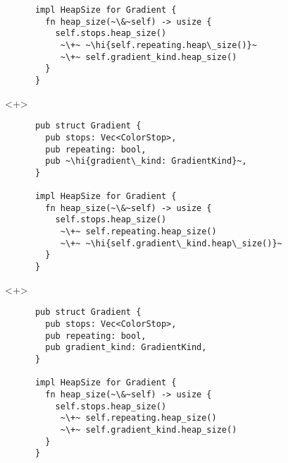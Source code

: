 \documentclass[usepdftitle=false]{beamer}
\renewcommand{\&}{\makebox[\widthof{\ampersand}][c]{\scalebox{0.9}[1.0]{\Book\ampersand}}}
\newcommand{\+}{\makebox[\widthof{+}][c]{\raisebox{-.2\height}{\scalefont{1.5}\Light+}}}
\newcommand{\hi}[1]{%
\tikz[baseline=(A.base)]
 \node[highlighting=0,inner sep=0pt,text depth=0pt] (A) {#1};%
}
\begin{document}
\begin{frame}[fragile]
\begin{onlyenv}
\begin{verbatim}
      impl HeapSize for Gradient {
        fn heap_size(~\&~self) -> usize {
          self.stops.heap_size()
           ~\+~ ~\hi{self.repeating.heap\_size()}~
           ~\+~ self.gradient_kind.heap_size()
        }
      }
    \end{verbatim}
  \end{onlyenv}
  \begin{onlyenv}<+>
    \begin{verbatim}
      pub struct Gradient {
        pub stops: Vec<ColorStop>,
        pub repeating: bool,
        pub ~\hi{gradient\_kind: GradientKind}~,
      }

      impl HeapSize for Gradient {
        fn heap_size(~\&~self) -> usize {
          self.stops.heap_size()
           ~\+~ self.repeating.heap_size()
           ~\+~ ~\hi{self.gradient\_kind.heap\_size()}~
        }
      }
    \end{verbatim}
  \end{onlyenv}
  \begin{onlyenv}<+>
    \begin{verbatim}
      pub struct Gradient {
        pub stops: Vec<ColorStop>,
        pub repeating: bool,
        pub gradient_kind: GradientKind,
      }

      impl HeapSize for Gradient {
        fn heap_size(~\&~self) -> usize {
          self.stops.heap_size()
           ~\+~ self.repeating.heap_size()
           ~\+~ self.gradient_kind.heap_size()
        }
      }
    \end{verbatim}
  \end{onlyenv}
\end{frame}
\end{document}
